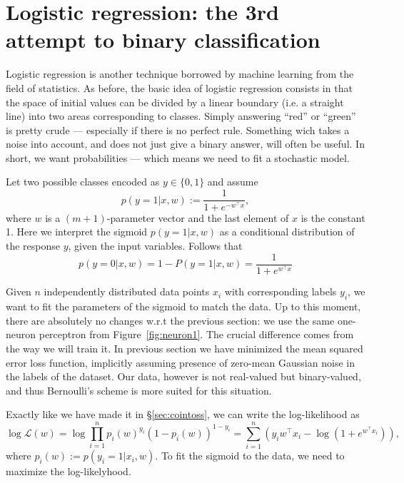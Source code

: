 \documentclass[notitlepage,oneside]{book}
\begin{document}
\section{Logistic regression: the 3rd attempt to binary classification}
\label{sec:logistic-regression}

Logistic regression is another technique borrowed by machine learning from the field of statistics.
As before, the basic idea of logistic regression consists in that the space of initial values can be divided by a
linear boundary (i.e. a straight line) into two areas corresponding to classes.
Simply answering ``red'' or ``green'' is pretty crude --- especially if there is no perfect rule.
Something wich takes a noise into account, and does not just give a binary answer, will often be useful.
In short, we want probabilities --- which means we need to fit a stochastic model.

Let two possible classes encoded as $y \in \{0,1\}$ and assume
\begin{equation}
\label{eq:logitproba}
p(y=1|x,w) := \frac{1}{1+e^{-w^\top x}},
\end{equation}
where $w$ is a $(m+1)$-parameter vector and the last element of $x$ is the constant 1.
Here we interpret the sigmoid $p(y=1|x,w)$ as a conditional distribution of the response $y$, given the input variables. 
Follows that
$$
p(y=0|x,w) = 1-P(y=1|x,w) = \frac{1}{1+e^{w^\top x}}
$$

Given $n$ independently distributed data points $x_i$ with corresponding labels $y_i$, we want to fit the parameters of the sigmoid to match the data.
Up to this moment, there are absolutely no changes w.r.t the previous section: we use the same one-neuron perceptron from Figure~\ref{fig:neuron1}.
The crucial difference comes from the way we will train it.
In previous section we have minimized the mean squared error loss function, implicitly assuming presence of zero-mean Gaussian noise in the labels of the dataset.
Our data, however is not real-valued but binary-valued, and thus Bernoulli's scheme is more suited for this situation.

Exactly like we have made it in \S\ref{sec:cointoss}, we can write the log-likelihood as
$$
\log \mathcal{L}(w) = \log \prod_{i=1}^n p_i(w)^{y_i}  (1-p_i(w))^{1-y_i} = \sum_{i=1}^n \left(y_i w^\top x_i - \log\left(1+e^{w^\top x_i}\right)\right),
$$
where $p_i(w):=p(y_i=1|x_i, w)$. To fit the sigmoid to the data, we need to maximize the log-likelyhood.
\end{document}
